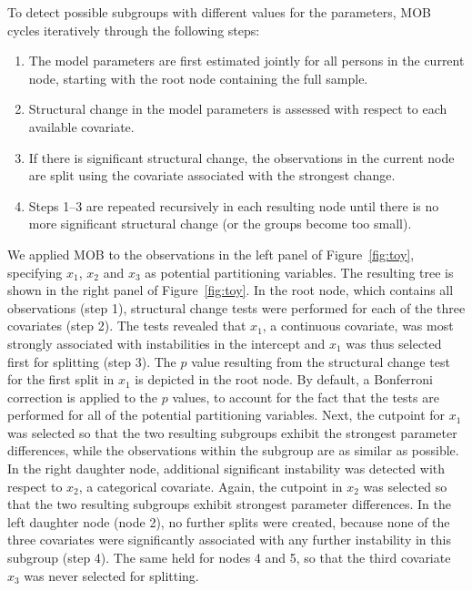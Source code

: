 \documentclass[doc,floatsintext,natbib]{apa7}
\begin{document}
To detect possible subgroups with different values for the parameters, MOB cycles iteratively through the following steps:

\begin{enumerate}
\setlength\itemsep{0.25em}
\item The model parameters are first estimated jointly for all persons in the current node, starting with the root node containing the full sample.
\item Structural change in the model parameters is assessed with respect to each available covariate.
\item If there is significant structural change, the observations in the current node are split using the covariate associated with the strongest change.
\item Steps 1--3 are repeated recursively in each resulting node until there is no more significant structural change (or the groups become too small).
\end{enumerate}

We applied MOB to the observations in the left panel of Figure~\ref{fig:toy}, specifying $x_1$, $x_2$ and $x_3$ as potential partitioning variables. The resulting tree is shown in the right panel of Figure~\ref{fig:toy}. In the root node, which contains all observations (step 1), structural change tests were performed for each of the three covariates (step 2). The tests revealed that $x_1$, a continuous covariate, was most strongly associated with instabilities in the intercept and $x_1$ was thus selected first for splitting (step 3). The $p$ value resulting from the structural change test for the first split in $x_1$ is depicted in the root node. By default, a Bonferroni correction is applied to the $p$ values, to account for the fact that the tests are performed for all of the potential partitioning variables. Next, the cutpoint for $x_1$ was selected so that the two resulting subgroups exhibit the strongest parameter differences, while the observations within the subgroup are as similar as possible. In the right daughter node, additional significant instability was detected with respect to $x_2$, a categorical covariate. Again, the cutpoint in $x_2$ was selected so that the two resulting subgroups exhibit strongest parameter differences. In the left daughter node (node 2), no further splits were created, because none of the three covariates were significantly associated with any further instability in this subgroup (step 4). The same held for nodes 4 and 5, so that the third covariate $x_3$ was never selected for splitting. 
\end{document}
